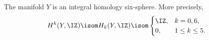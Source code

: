 \begin{cor}\label{cor: integral homology}
The manifold $Y$ is an integral homology six-sphere. More precisely,
\[
 H^k(Y,\IZ)\isom H_k(Y,\IZ)\isom
 \begin{cases}
  \IZ,&k=0,6,\\
  0,&1\leq k\leq5.
 \end{cases}
\]
\end{cor}